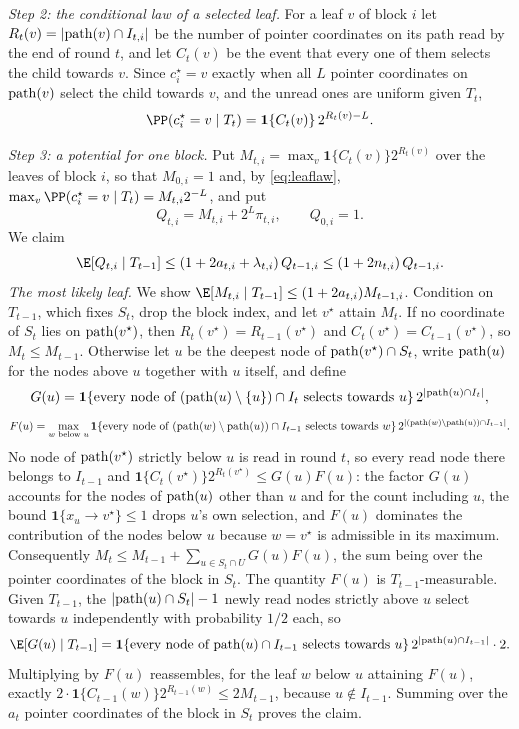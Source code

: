 \emph{Step 2: the conditional law of a selected leaf.}
For a leaf $v$ of block $i$ let $R_t(v)=|{\rm path}(v)\cap I_{t,i}|$ be the
number of pointer coordinates on its path read by the end of round $t$, and
let $C_t(v)$ be the event that every one of them selects the child towards
$v$. Since $c_i^\star=v$ exactly when all $L$ pointer coordinates on
${\rm path}(v)$ select the child towards $v$, and the unread ones are
uniform given $T_t$,
\begin{equation}
 \PP(c_i^\star=v\mid T_t)=\mathbf 1\{C_t(v)\}\,2^{R_t(v)-L}.\label{eq:leaflaw}
\end{equation}

\emph{Step 3: a potential for one block.}
Put $M_{t,i}=\max_v\mathbf 1\{C_t(v)\}2^{R_t(v)}$ over the leaves of block
$i$, so that $M_{0,i}=1$ and, by \eqref{eq:leaflaw},
$\max_v\PP(c_i^\star=v\mid T_t)=M_{t,i}2^{-L}$, and put
\[
 Q_{t,i}=M_{t,i}+2^L\pi_{t,i},\qquad Q_{0,i}=1 .
\]
We claim
\begin{equation}
 \E[Q_{t,i}\mid T_{t-1}]\le(1+2a_{t,i}+\lambda_{t,i})\,Q_{t-1,i}\le(1+2n_{t,i})\,Q_{t-1,i}.\label{eq:potential}
\end{equation}
\emph{The most likely leaf.} We show
$\E[M_{t,i}\mid T_{t-1}]\le(1+2a_{t,i})M_{t-1,i}$. Condition on $T_{t-1}$,
which fixes $S_t$, drop the block index, and let $v^\star$ attain $M_t$. If no
coordinate of $S_t$ lies on ${\rm path}(v^\star)$, then
$R_t(v^\star)=R_{t-1}(v^\star)$ and $C_t(v^\star)=C_{t-1}(v^\star)$, so
$M_t\le M_{t-1}$. Otherwise let $u$ be the deepest node of
${\rm path}(v^\star)\cap S_t$, write ${\rm path}(u)$ for the nodes above $u$
together with $u$ itself, and define
\[
 G(u)=\mathbf 1\{\text{every node of }({\rm path}(u)\setminus\{u\})\cap I_t\text{ selects towards }u\}\,2^{|{\rm path}(u)\cap I_t|},
\]
\[
 F(u)=\max_{w\text{ below }u}\mathbf 1\{\text{every node of }({\rm path}(w)\setminus{\rm path}(u))\cap I_{t-1}\text{ selects towards }w\}\,2^{|({\rm path}(w)\setminus{\rm path}(u))\cap I_{t-1}|}.
\]
No node of ${\rm path}(v^\star)$ strictly below $u$ is read in round $t$, so
every read node there belongs to $I_{t-1}$ and
$\mathbf 1\{C_t(v^\star)\}2^{R_t(v^\star)}\le G(u)F(u)$: the factor $G(u)$
accounts for the nodes of ${\rm path}(u)$ other than $u$ and for the count
including $u$, the bound $\mathbf 1\{x_u\to v^\star\}\le1$ drops $u$'s own
selection, and $F(u)$ dominates the contribution of the nodes below $u$
because $w=v^\star$ is admissible in its maximum. Consequently
$M_t\le M_{t-1}+\sum_{u\in S_t\cap U}G(u)F(u)$, the sum being over the
pointer coordinates of the block in $S_t$. The quantity $F(u)$ is
$T_{t-1}$-measurable. Given $T_{t-1}$, the $|{\rm path}(u)\cap S_t|-1$ newly
read nodes strictly above $u$ select towards $u$ independently with
probability $1/2$ each, so
\[
 \E[G(u)\mid T_{t-1}]
 =\mathbf 1\{\text{every node of }{\rm path}(u)\cap I_{t-1}\text{ selects towards }u\}\,
   2^{|{\rm path}(u)\cap I_{t-1}|}\cdot2 .
\]
Multiplying by $F(u)$ reassembles, for the leaf $w$ below $u$ attaining
$F(u)$, exactly $2\cdot\mathbf 1\{C_{t-1}(w)\}2^{R_{t-1}(w)}\le2M_{t-1}$,
because $u\notin I_{t-1}$. Summing over the $a_t$ pointer coordinates of the
block in $S_t$ proves the claim.

